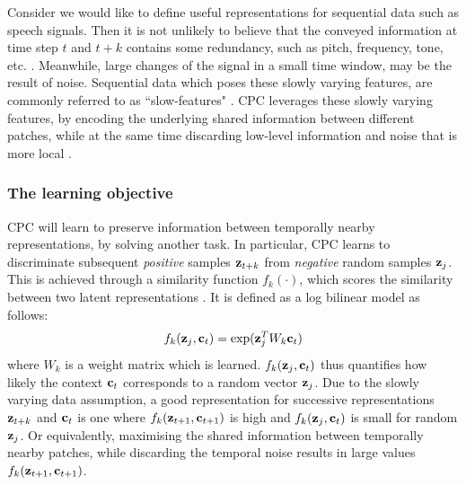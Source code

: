 	Consider we would like to define useful representations for sequential data such as speech signals. Then it is not unlikely to believe that the conveyed information at time step $t$ and $t+k$ contains some redundancy, such as pitch, frequency, tone, etc. \cite{raoUnderstandingGradientIsolatedLearning2020}. Meanwhile, large changes of the signal in a small time window, may be the result of noise. Sequential data which poses these slowly varying features, are commonly referred to as ``slow-features" \cite{zhangSlowFeatureAnalysis2012}. CPC leverages these slowly varying features, by encoding the underlying shared information between different patches, while at the same time discarding low-level information and noise that is more local \cite{oordRepresentationLearningContrastive2019}.


\subsubsection{The learning objective}
	
	
	CPC will learn to preserve information between temporally nearby representations, by solving another task. In particular, CPC learns to discriminate subsequent \textit{positive} samples $\mathbf{z}_{t+k}$ from \textit{negative} random samples $\mathbf{z}_j$. This is achieved through a similarity function $f_k(\cdot)$, which scores the similarity between two latent representations \cite{lowePuttingEndEndtoEnd2020}. It is defined as a log bilinear model as follows:
	\begin{equation} %
		\fkdefinition \label{eq:fk}
	\end{equation}
	where $W_k$ is a weight matrix which is learned. $f_k( \mathbf{z}_j , \mathbf{c}_t )$ thus quantifies how likely the context $\mathbf{c}_t$ corresponds to a random vector $\mathbf{z}_j$. Due to the slowly varying data assumption, a good representation for successive representations $\mathbf{z}_{t+k}$ and $\mathbf{c}_t$ is one where $f_k( \mathbf{z}_{t+1}, \mathbf{c}_{t+1})$ is high and $f_k( \mathbf{z}_j, \mathbf{c}_t)$ is small for random $\mathbf{z}_j$. Or equivalently, maximising the shared information between temporally nearby patches, while discarding the temporal noise results in large values $f_k( \mathbf{z}_{t+1}, \mathbf{c}_{t+1})$.
	
